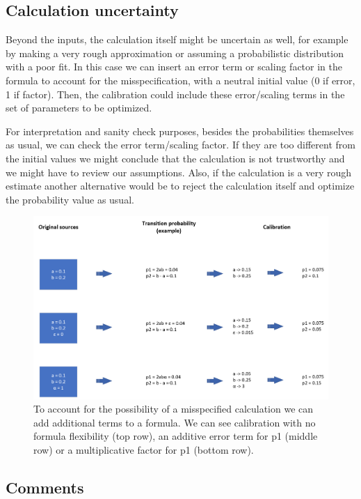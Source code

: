 \subsection{Calculation uncertainty}
Beyond the inputs, the calculation itself might be uncertain as well, for example by making a very rough approximation or assuming a probabilistic distribution with a poor fit. In this case we can insert an error term or scaling factor in the formula to account for the misspecification, with a neutral initial value (0 if error, 1 if factor). Then, the calibration could include these error/scaling terms in the set of parameters to be optimized.

For interpretation and sanity check purposes, besides the probabilities themselves as usual, we can check the error term/scaling factor. If they are too different from the initial values we might conclude that the calculation is not trustworthy and we might have to review our assumptions. Also, if the calculation is a very rough estimate another alternative would be to reject the calculation itself and optimize the probability value as usual.

\begin{figure}[h!]
	\centering
	\includegraphics[width=\textwidth]{figures/calibration_calculation}
	\decoRule
	\caption[Calibration over calculations]{To account for the possibility of a misspecified calculation we can add additional terms to a formula. We can see calibration with no formula flexibility (top row), an additive error term for p1 (middle row) or a multiplicative factor for p1 (bottom row).}
	\label{fig:calibration_calculation}
\end{figure}

\subsection{Comments}

